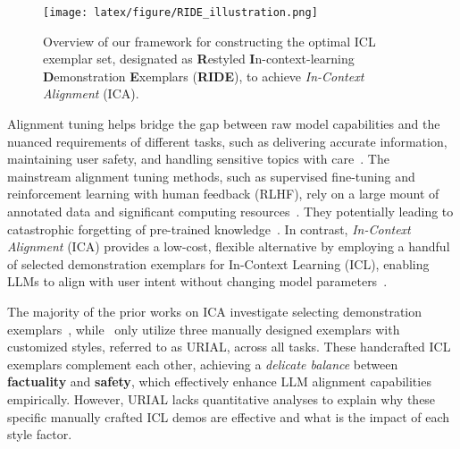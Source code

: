 \begin{figure*}[tbp]
    \centering
    \texttt{[image: latex/figure/RIDE\_illustration.png]} 
    \caption{Overview of our framework for constructing the optimal ICL exemplar set, designated as \textbf{R}estyled \textbf{I}n-context-learning \textbf{D}emonstration \textbf{E}xemplars (\textbf{RIDE}), to achieve \textit{In-Context Alignment} (ICA).} 
    \label{figure:ride_illustration}
\end{figure*}

Alignment tuning helps bridge the gap between raw model capabilities and the nuanced requirements of different tasks, such as delivering accurate information, maintaining user safety, and handling sensitive topics with care~\citep{shneiderman2020bridging,wang2023aligning,DBLP:conf/iclr/Qi0XC0M024}. 
The mainstream alignment tuning methods, such as supervised fine-tuning and reinforcement learning with human feedback (RLHF), rely on a large mount of annotated data and significant computing resources~\citep{ouyang2022training,sun2023aligning,DBLP:conf/iclr/DaiPSJXL0024,rafailov2024direct,zhou2024lima,wu2024self}. They potentially leading to catastrophic forgetting of pre-trained knowledge~\cite{wang2023far}. In contrast, \textit{In-Context Alignment} (ICA) provides a low-cost, flexible alternative by employing a handful of selected demonstration exemplars for In-Context Learning (ICL), enabling LLMs to align with user intent without changing model parameters~\cite{DBLP:conf/iclr/LinRLDSCB024}.

The majority of the prior works on ICA investigate selecting demonstration exemplars~\cite{liu2022makes,min2022rethinking,DBLP:conf/icml/Ye0F0K23,peng2024revisiting,DBLP:conf/icml/ChoiL24,DBLP:conf/eacl/WangYW24}, while~\citet{DBLP:conf/iclr/LinRLDSCB024} only utilize three manually designed exemplars with customized styles, referred to as URIAL, across all tasks. These handcrafted ICL exemplars complement each other, achieving a \textit{delicate balance} between \textbf{\color{myblue} factuality} and \textbf{\color{myred} safety}, which effectively enhance LLM alignment capabilities empirically. However, URIAL lacks quantitative analyses to explain why these specific manually crafted ICL demos are effective and what is the impact of each style factor.

